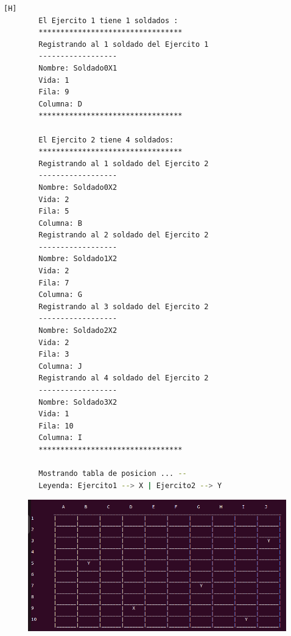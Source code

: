 \documentclass{article}
\begin{document}
	\begin{lstlisting}[language=bash,caption={Ejecucion:}][H]
		El Ejercito 1 tiene 1 soldados : 
		*********************************
		Registrando al 1 soldado del Ejercito 1
		------------------
		Nombre: Soldado0X1
		Vida: 1
		Fila: 9
		Columna: D
		*********************************

		El Ejercito 2 tiene 4 soldados:
		*********************************
		Registrando al 1 soldado del Ejercito 2
		------------------
		Nombre: Soldado0X2
		Vida: 2
		Fila: 5
		Columna: B
		Registrando al 2 soldado del Ejercito 2
		------------------
		Nombre: Soldado1X2
		Vida: 2
		Fila: 7
		Columna: G
		Registrando al 3 soldado del Ejercito 2
		------------------
		Nombre: Soldado2X2
		Vida: 2
		Fila: 3
		Columna: J
		Registrando al 4 soldado del Ejercito 2
		------------------
		Nombre: Soldado3X2
		Vida: 1
		Fila: 10
		Columna: I
		*********************************

		Mostrando tabla de posicion ... --
		Leyenda: Ejercito1 --> X | Ejercito2 --> Y


	\end{lstlisting}
	\begin{figure}[H]
		\centering
		\includegraphics[width=1.0\textwidth,keepaspectratio]{img/Commit12.png}
	\end{figure}
\end{document}
